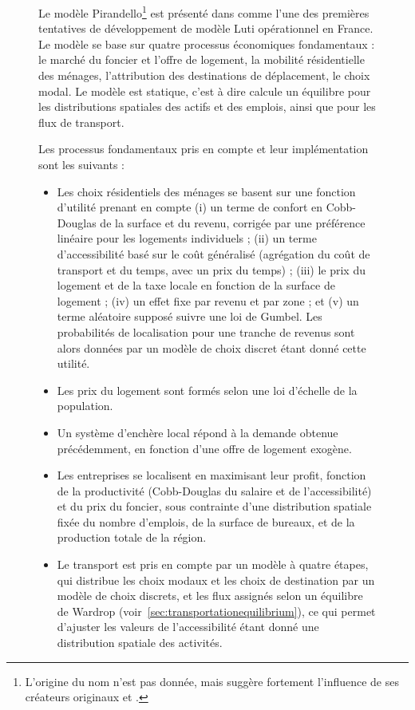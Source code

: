 \begin{figure}
	\begin{mdframed}
	
	Le modèle Pirandello\textregistered\footnote{L'origine du nom n'est pas donnée, mais suggère fortement l'influence de ses créateurs originaux  et .} est présenté dans \cite{delons:hal-00319087} comme l'une des premières tentatives de développement de modèle Luti opérationnel en France. Le modèle se base sur quatre processus économiques fondamentaux : le marché du foncier et l'offre de logement, la mobilité résidentielle des ménages, l'attribution des destinations de déplacement, le choix modal. Le modèle est statique, c'est à dire calcule un équilibre pour les distributions spatiales des actifs et des emplois, ainsi que pour les flux de transport.
	
	Les processus fondamentaux pris en compte et leur implémentation sont les suivants :
	\begin{itemize}
		\item Les choix résidentiels des ménages se basent sur une fonction d'utilité prenant en compte (i) un terme de confort en Cobb-Douglas de la surface et du revenu, corrigée par une préférence linéaire pour les logements individuels ; (ii) un terme d'accessibilité basé sur le coût généralisé (agrégation du coût de transport et du temps, avec un prix du temps) ; (iii) le prix du logement et de la taxe locale en fonction de la surface de logement ; (iv) un effet fixe par revenu et par zone ; et (v) un terme aléatoire supposé suivre une loi de Gumbel. Les probabilités de localisation pour une tranche de revenus sont alors données par un modèle de choix discret étant donné cette utilité.
		\item Les prix du logement sont formés selon une loi d'échelle de la population.
		\item Un système d'enchère local répond à la demande obtenue précédemment, en fonction d'une offre de logement exogène.
		\item Les entreprises se localisent en maximisant leur profit, fonction de la productivité (Cobb-Douglas du salaire et de l'accessibilité) et du prix du foncier, sous contrainte d'une distribution spatiale fixée du nombre d'emplois, de la surface de bureaux, et de la production totale de la région.
		\item Le transport est pris en compte par un modèle à quatre étapes, qui distribue les choix modaux et les choix de destination par un modèle de choix discrets, et les flux assignés selon un équilibre de Wardrop (voir~\ref{sec:transportationequilibrium}), ce qui permet d'ajuster les valeurs de l'accessibilité étant donné une distribution spatiale des activités.
	\end{itemize}
	

\end{mdframed}
\end{figure}
